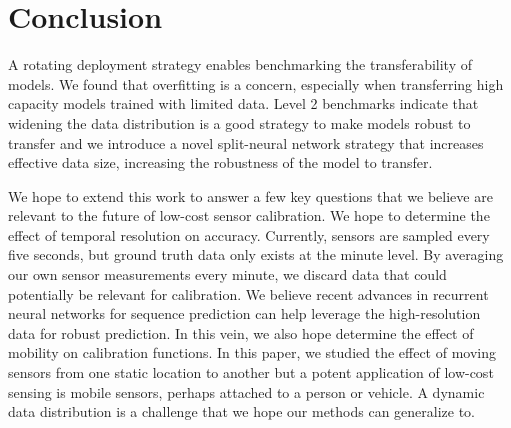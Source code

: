 \documentclass[journal abbreviation, manuscript]{copernicus}
\newcommand\todo[1]{\textcolor{red}{#1}}
\begin{document}

\section{Conclusion}

A rotating deployment strategy enables benchmarking the transferability of models. We found that overfitting is a concern, especially when transferring high capacity models trained with limited data. Level 2 benchmarks indicate that widening the data distribution is a good strategy to make models robust to transfer and we introduce a novel split-neural network strategy that increases effective data size, increasing the robustness of the model to transfer.

We hope to extend this work to answer a few key questions that we believe are relevant to the future of low-cost sensor calibration. 
We hope to determine the effect of temporal resolution on accuracy. Currently, sensors are sampled every five seconds, but ground truth data only exists at the minute level. By averaging our own sensor measurements every minute, we discard data that could potentially be relevant for calibration. We believe recent advances in recurrent neural networks for sequence prediction can help leverage the high-resolution data for robust prediction. In this vein, we also hope determine the effect of mobility on calibration functions. In this paper, we studied the effect of moving sensors from one static location to another but a potent application of low-cost sensing is mobile sensors, perhaps attached to a person or vehicle. A dynamic data distribution is a challenge that we hope our methods can generalize to.
\end{document}
